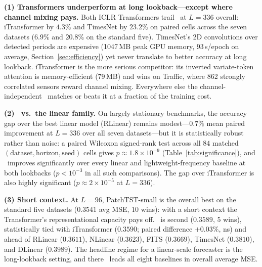 \textbf{(1) Transformers underperform at long lookback---except where
channel mixing pays.} Both ICLR Transformers trail \method\ at $L{=}336$
overall: iTransformer by $4.3\%$ and TimesNet by $23.2\%$ on paired cells
across the seven datasets ($6.9\%$ and $20.8\%$ on the standard five).
TimesNet's 2D convolutions over detected periods are expensive (1047\,MB peak
GPU memory, 93\,s/epoch on average, Section~\ref{sec:efficiency}) yet never
translate to better accuracy at long lookback. iTransformer is the more
serious competitor: its inverted variate-token attention is memory-efficient
(79\,MB) and wins on Traffic, where 862 strongly correlated sensors reward
channel mixing. Everywhere else the channel-independent \method\ matches or
beats it at a fraction of the training cost.

\textbf{(2) \method\ vs.\ the linear family.} On largely stationary
benchmarks, the accuracy gap over the best linear model (RLinear) remains
modest---$0.7\%$ mean paired improvement at $L{=}336$ over all seven
datasets---but it is statistically robust rather than noise: a paired Wilcoxon
signed-rank test across all $84$ matched
$(\text{dataset},\text{horizon},\text{seed})$ cells gives $p \approx 1.8\times10^{-9}$
(Table~\ref{tab:significance}), and \method\ improves significantly
over every linear and lightweight-frequency baseline at both lookbacks
($p < 10^{-3}$ in all such comparisons). The gap over iTransformer is also
highly significant ($p \approx 2\times10^{-5}$ at $L{=}336$).

\textbf{(3) Short context.} At $L{=}96$, PatchTST-small is the overall best
on the standard five datasets ($0.3541$ avg MSE, $10$ wins): with a short
context the Transformer's representational capacity pays off. \method\ is
second ($0.3589$, $5$ wins), statistically tied with iTransformer ($0.3590$;
paired difference $+0.03\%$, ns) and ahead of RLinear ($0.3611$), NLinear
($0.3623$), FITS ($0.3669$), TimesNet ($0.3810$), and DLinear ($0.3989$). The
headline regime for a linear-scale forecaster is the long-lookback setting,
and there \method\ leads all eight baselines in overall average MSE.


